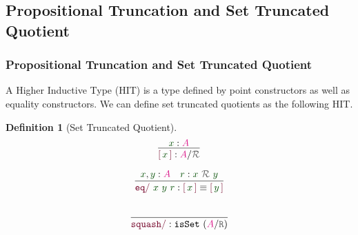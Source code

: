 \documentclass[xelatex,mathserif,serif,notheorems]{beamer} %
\theoremstyle{plain} %
\theoremstyle{definition}
\newtheorem{defn}[thm]{Definition}%
\theoremstyle{remark}
\newcommand*{\term}[1]{\textcolor{green!30!black}{#1}} %
\newcommand*{\type}[1]{\textcolor{magenta!90!black}{#1}}
\newcommand*{\relation}[1]{\textcolor{gray!75!black}{\ensuremath{\mathtt{#1}}}}
\newcommand*{\constructor}[1]{\textcolor{purple!60!black}{\ensuremath{\mathtt{#1}}}}
\newcommand*{\quotientconstructor}[1]{\constructor{[}\,#1\,\constructor{]}}
\newcommand{\setlengths}{
  \setlength{\abovedisplayskip}{4pt}
  \setlength{\belowdisplayskip}{4pt}
  \setlength{\abovedisplayshortskip}{2pt}
  \setlength{\belowdisplayshortskip}{2pt}
}
\newcommand{\startwitheq}{\vspace{-2.5mm}} %
\begin{document}
\subsection{Propositional Truncation and Set Truncated Quotient}
\begin{frame}
  \frametitle{Propositional Truncation and Set Truncated Quotient}
  A Higher Inductive Type (HIT) is a type defined by point constructors as well as equality constructors. \pause %
  \pause
  We can define set truncated quotients as the following HIT.
  \begin{defn}[Set Truncated Quotient]\setlengths \startwitheq
    \strut
    \hfill
    \begin{minipage}[b]{0.25\linewidth}
      \begin{equation}
        \vcenter{\infer{\quotientconstructor{\term{x}} : \type{A} / \relation{\mathcal{R}}}{\term{x} : \type{A}}}
      \end{equation}
    \end{minipage}
    \hfill
    \begin{minipage}[b]{0.4\linewidth}
      \begin{equation}
        \vcenter{\infer{\constructor{eq/}~\term{x}~\term{y}~\term{r} : \quotientconstructor{\term{x}} \equiv \quotientconstructor{\term{y}}}{\term{x}, \term{y} : \type{A} & \term{r} : \term{x}~\relation{\mathcal{R}}~\term{y}}}
      \end{equation}
    \end{minipage}
    \hfill
    \strut
    \begin{equation}
      \vcenter{\infer{\constructor{squash/} :\texttt{isSet}~(\type{A} / \relation{R})}{\strut}}
    \end{equation}
  \end{defn}
\end{frame}
\end{document}
